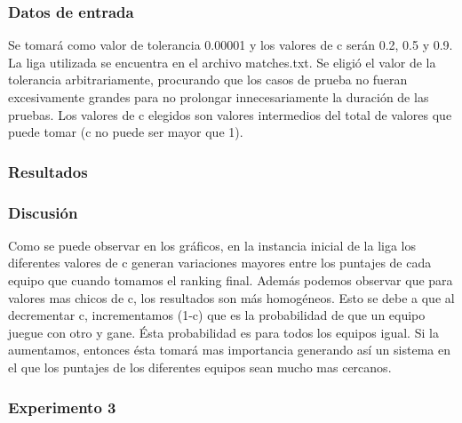             \subsubsection*{Datos de entrada}
            Se tomará como valor de tolerancia 0.00001 y los valores de c serán 0.2, 0.5 y 0.9. La liga utilizada se encuentra en el archivo matches.txt. Se eligió el valor de la tolerancia arbitrariamente, procurando que los casos de prueba no fueran excesivamente grandes para no prolongar innecesariamente la duración de las pruebas. Los valores de c elegidos son valores intermedios del total de valores que puede tomar (c no puede ser mayor que 1).

            \subsubsection*{Resultados}
            

            \subsubsection*{Discusión}
            Como se puede observar en los gráficos, en la instancia inicial de la liga los diferentes valores de c generan variaciones mayores entre los puntajes de cada equipo que cuando tomamos el ranking final. 
            Además podemos observar que para valores mas chicos de c, los resultados son más homogéneos. Esto se debe a que al decrementar c, incrementamos (1-c) que es la probabilidad de que un equipo juegue con otro y gane. Ésta probabilidad es para todos los equipos igual. Si la aumentamos, entonces ésta tomará mas importancia generando así un sistema en el que los puntajes de los diferentes equipos sean mucho mas cercanos. 


        \subsubsection{Experimento 3}

